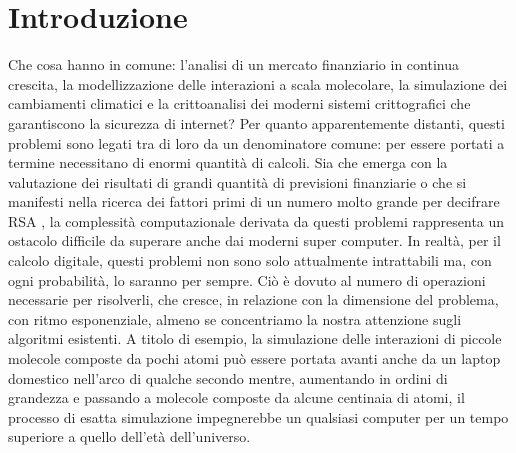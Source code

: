 \documentclass[12pt,a4paper,openright]{report}
\begin{document}
\chapter{Introduzione}
Che cosa hanno in comune: l'analisi di un mercato finanziario in continua crescita, la modellizzazione delle interazioni a scala molecolare, la simulazione dei cambiamenti climatici 
e la crittoanalisi dei moderni sistemi crittografici che garantiscono la sicurezza di internet?
Per quanto apparentemente distanti, questi problemi sono legati tra di loro da un denominatore comune: per essere portati a termine necessitano di enormi quantità di calcoli.
Sia che emerga con la valutazione dei risultati di grandi quantità di previsioni finanziarie o che si manifesti nella ricerca dei fattori primi di un numero molto grande per decifrare RSA \cite{ref22},
la complessità computazionale derivata da questi problemi rappresenta un ostacolo difficile da superare anche dai moderni super computer.
In realtà, per il calcolo digitale, questi problemi non sono solo attualmente intrattabili ma, con ogni probabilità, lo saranno per sempre. Ciò è dovuto al numero di operazioni necessarie per risolverli,
che cresce, in relazione con la dimensione del problema, con ritmo esponenziale, almeno se concentriamo la nostra attenzione sugli algoritmi esistenti.
A titolo di esempio, la simulazione delle interazioni di piccole molecole composte da pochi atomi può essere portata avanti anche da un laptop domestico nell'arco di qualche secondo mentre, aumentando in ordini di grandezza e 
passando a molecole composte da alcune centinaia di atomi, il processo di esatta simulazione impegnerebbe un qualsiasi computer per un tempo superiore a quello dell'età dell'universo.
\end{document}
